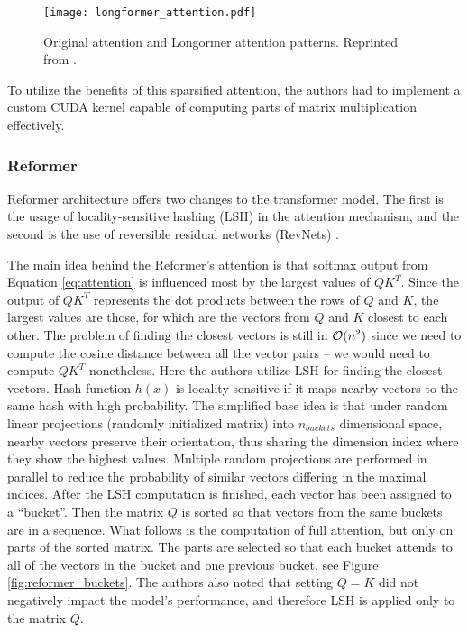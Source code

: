 \begin{figure}[!htb]
        \centering
        \texttt{[image: longformer\_attention.pdf]}
        \caption[Longformer Attention Patterns]{Original attention and Longormer attention patterns. Reprinted from \citep{longformer}.}
        \label{fig:longformer_attention}
\end{figure}

To utilize the benefits of this sparsified attention, the authors had to implement a custom CUDA kernel capable of computing parts of matrix multiplication effectively. 

\subsubsection{Reformer}

Reformer architecture \citep{reformer} offers two changes to the transformer model.
The first is the usage of locality-sensitive hashing (LSH) \citep{lsh} in the attention mechanism, and the second is the use of reversible residual networks (RevNets) \citep{revnets}.

The main idea behind the Reformer's attention is that softmax output from Equation \ref{eq:attention} is influenced most by the largest values of $QK^T$. 
Since the output of $QK^T$ represents the dot products between the rows of $Q$ and $K$, the largest values are those, for which are the vectors from $Q$ and $K$ closest to each other.
The problem of finding the closest vectors is still in $\mathcal{O}(n^2)$ since we need to compute the cosine distance between all the vector pairs -- we would need to compute $QK^T$ nonetheless. %
Here the authors utilize LSH for finding the closest vectors.
Hash function $h(x)$ is locality-sensitive if it maps nearby vectors to the same hash with high probability. 
The simplified base idea is that under random linear projections (randomly initialized matrix) into $n_{buckets}$ dimensional space, nearby vectors preserve their orientation, thus sharing the dimension index where they show the highest values.
Multiple random projections are performed in parallel to reduce the probability of similar vectors differing in the maximal indices.
After the LSH computation is finished, each vector has been assigned to a ``bucket''.
Then the matrix $Q$ is sorted so that vectors from the same buckets are in a sequence.
What follows is the computation of full attention, but only on parts of the sorted matrix.
The parts are selected so that each bucket attends to all of the vectors in the bucket and one previous bucket, see Figure \ref{fig:reformer_buckets}.
The authors also noted that setting $Q=K$ did not negatively impact the model's performance, and therefore LSH is applied only to the matrix $Q$.

